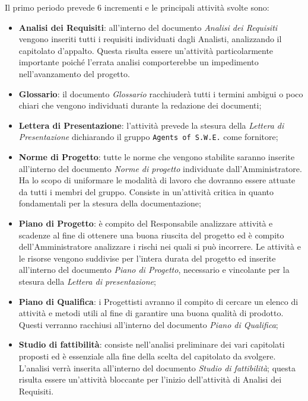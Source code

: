 Il primo periodo prevede 6 incrementi e le principali attività svolte sono: 
\begin{itemize}
	\item \textbf{Analisi dei Requisiti}: all'interno del documento \textit{Analisi dei Requisiti} vengono inseriti tutti i requisiti individuati dagli Analisti, analizzando il capitolato d'appalto. Questa risulta essere un'attività particolarmente importante poiché l'errata analisi comporterebbe un impedimento nell'avanzamento del progetto.
	\item \textbf{Glossario}: il documento \textit{Glossario} racchiuderà tutti i termini ambigui o poco chiari che vengono individuati durante la redazione dei documenti;
	\item \textbf{Lettera di Presentazione}: l'attività prevede la stesura della \textit{Lettera di Presentazione} dichiarando il gruppo \texttt{Agents of S.W.E.} come fornitore;
	\item \textbf{Norme di Progetto}: tutte le norme che vengono stabilite saranno inserite all'interno del documento \textit{Norme di progetto} individuate dall'Amministratore. Ha lo scopo di uniformare le modalità di lavoro che dovranno essere attuate da tutti i membri del gruppo. Consiste in un'attività critica in quanto fondamentali per la stesura della documentazione;
	\item \textbf{Piano di Progetto}: è compito del Responsabile analizzare attività e scadenze al fine di ottenere una buona riuscita del progetto ed è compito dell'Amministratore analizzare i rischi nei quali si può incorrere. Le attività e le risorse vengono suddivise per l'intera durata del progetto ed inserite all'interno del documento \textit{Piano di Progetto}, necessario e vincolante per la stesura della \textit{Lettera di presentazione};
	\item \textbf{Piano di Qualifica}: i Progettisti avranno il compito di cercare un elenco di attività e metodi utili al fine di garantire una buona qualità di prodotto. Questi verranno racchiusi all'interno del documento \textit{Piano di Qualifica};
	\item \textbf{Studio di fattibilità}: consiste nell'analisi preliminare dei vari capitolati proposti ed è essenziale alla fine della scelta del capitolato da svolgere. L'analisi verrà inserita all'interno del documento \textit{Studio di fattibilità}; questa risulta essere un'attività bloccante per l'inizio dell'attività di Analisi dei Requisiti.  
\end{itemize}